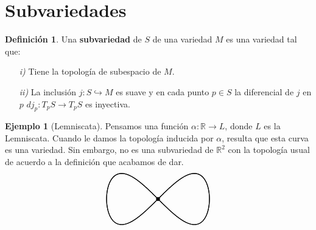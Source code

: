 \documentclass[spanish]{book}
\theoremstyle{definition}
\newtheorem*{defn}{Definición}
\newtheorem*{ejem}{Ejemplo}
\newcommand{\R}{\mathbb{R}}
\begin{document}
	\section{Subvariedades}
	\begin{defn}
		Una \textbf{subvariedad} de $S$ de una variedad $M$ es una variedad tal que:
		\begin{enumerate}
			\item[\textit{i)}] Tiene la topología de subespacio de $M$.
			\item[\textit{ii)}] La inclusión $j:S\hookrightarrow M$ es suave y en cada punto $p\in S$ la diferencial de $j$ en $p$ $dj_p:T_pS\to T_pS$ es inyectiva.
		\end{enumerate}
	\end{defn}
	\begin{ejem}[Lemniscata]
		Pensamos una función $\alpha:\R\to L$, donde $L$ es la Lemniscata. Cuando le damos la topología inducida por $\alpha$, resulta que esta curva es una variedad. Sin embargo, no es una subvariedad de $\R^2$ con la topología usual de acuerdo a la definición que acabamos de dar.
		\[\begin{tikzpicture}[scale=1.5]
			
			\draw[thick, domain=0:360, samples=500] plot ({sqrt(2) * cos(\x)} , {sqrt(2) * cos(\x) * sin(\x)});
			\draw[thick, domain=0:360, samples=500] plot ({-sqrt(2) * cos(\x)} , {-sqrt(2) * cos(\x) * sin(\x)});
			
			\draw[fill=black] (0,0) circle (0.05);
		\end{tikzpicture}\]
	\end{ejem}
\end{document}
